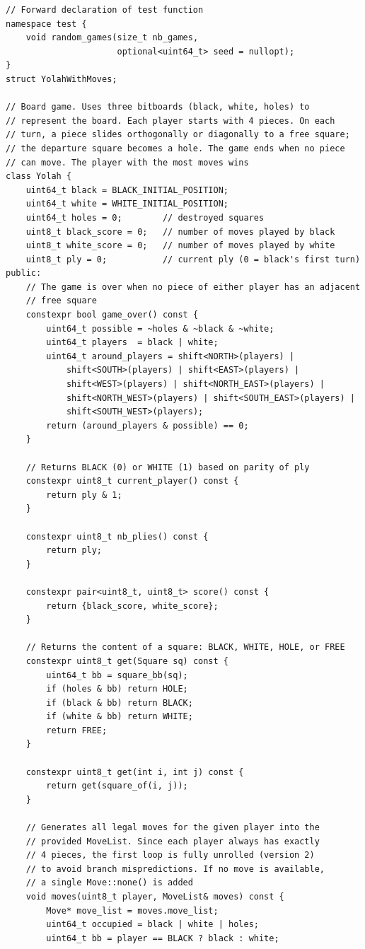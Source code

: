\documentclass[12pt,a4paper,twoside,openright]{book}
\begin{document}
\begin{mdframed}[skipabove=\baselineskip,topline=false,rightline=false,bottomline=false,leftline=false,linewidth=1pt,linecolor=gray!40,innerleftmargin=8pt]
\begin{verbatim}
// Forward declaration of test function
namespace test {
    void random_games(size_t nb_games, 
                      optional<uint64_t> seed = nullopt);
}
struct YolahWithMoves;

// Board game. Uses three bitboards (black, white, holes) to 
// represent the board. Each player starts with 4 pieces. On each 
// turn, a piece slides orthogonally or diagonally to a free square; 
// the departure square becomes a hole. The game ends when no piece 
// can move. The player with the most moves wins
class Yolah {
    uint64_t black = BLACK_INITIAL_POSITION;
    uint64_t white = WHITE_INITIAL_POSITION;
    uint64_t holes = 0;        // destroyed squares
    uint8_t black_score = 0;   // number of moves played by black
    uint8_t white_score = 0;   // number of moves played by white
    uint8_t ply = 0;           // current ply (0 = black's first turn)
public:
    // The game is over when no piece of either player has an adjacent 
    // free square
    constexpr bool game_over() const {
        uint64_t possible = ~holes & ~black & ~white;
        uint64_t players  = black | white;
        uint64_t around_players = shift<NORTH>(players) |
            shift<SOUTH>(players) | shift<EAST>(players) |
            shift<WEST>(players) | shift<NORTH_EAST>(players) |
            shift<NORTH_WEST>(players) | shift<SOUTH_EAST>(players) |
            shift<SOUTH_WEST>(players);
        return (around_players & possible) == 0;
    }

    // Returns BLACK (0) or WHITE (1) based on parity of ply
    constexpr uint8_t current_player() const {
        return ply & 1;
    }

    constexpr uint8_t nb_plies() const {
        return ply;
    }

    constexpr pair<uint8_t, uint8_t> score() const {
        return {black_score, white_score};
    }

    // Returns the content of a square: BLACK, WHITE, HOLE, or FREE
    constexpr uint8_t get(Square sq) const {
        uint64_t bb = square_bb(sq);
        if (holes & bb) return HOLE;
        if (black & bb) return BLACK;
        if (white & bb) return WHITE;
        return FREE;
    }

    constexpr uint8_t get(int i, int j) const {        
        return get(square_of(i, j));
    }

    // Generates all legal moves for the given player into the 
    // provided MoveList. Since each player always has exactly 
    // 4 pieces, the first loop is fully unrolled (version 2) 
    // to avoid branch mispredictions. If no move is available,
    // a single Move::none() is added
    void moves(uint8_t player, MoveList& moves) const {
        Move* move_list = moves.move_list;
        uint64_t occupied = black | white | holes;
        uint64_t bb = player == BLACK ? black : white;


\end{verbatim}
\end{mdframed}
\end{document}
